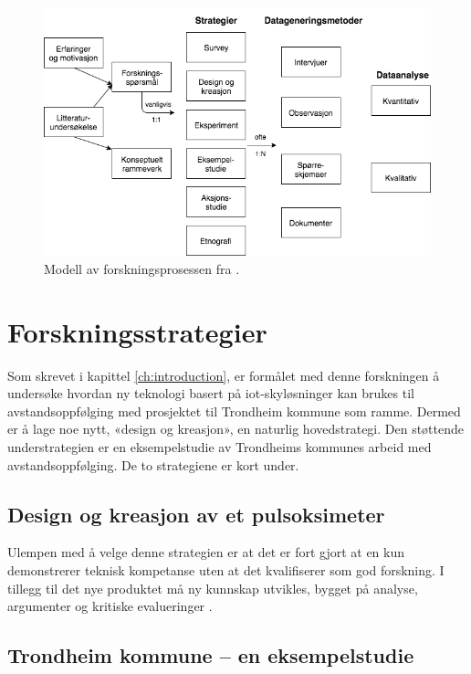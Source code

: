 \begin{figure}
\centering
\includegraphics[width=\textwidth]{fig/oates/oates_research_norwegian}
\caption{Modell av forskningsprosessen fra \citet{oates}.}
\label{fig:oates_model}
\end{figure}

\section{Forskningsstrategier}
Som skrevet i kapittel \ref{ch:introduction}, er formålet med denne forskningen å undersøke hvordan ny teknologi basert
på \gls{iot}-skyløsninger kan brukes til avstandsoppfølging med prosjektet til Trondheim kommune som ramme. Dermed er å lage noe nytt,
«design og kreasjon», en naturlig hovedstrategi. Den støttende understrategien er en eksempelstudie av Trondheims kommunes arbeid
med avstandsoppfølging. De to strategiene er kort under.

\subsection{Design og kreasjon av et pulsoksimeter}
Ulempen med å velge denne strategien er at det er fort gjort at en kun demonstrerer
teknisk kompetanse uten at det kvalifiserer som god forskning. I tillegg til det nye produktet må ny kunnskap utvikles, bygget på analyse, argumenter
og kritiske evalueringer \citep[s. 109]{oates}.
\blindtext

\subsection{Trondheim kommune -- en eksempelstudie}
\blindtext

